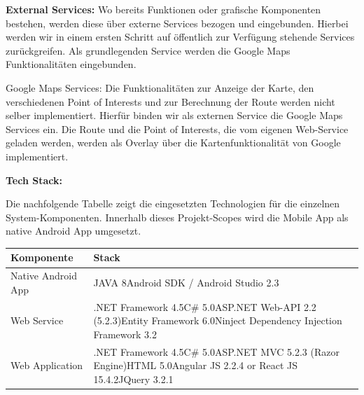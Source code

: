 \documentclass[ngerman,]{article}
\begin{document}
\textbf{External Services:} Wo bereits Funktionen oder grafische
Komponenten bestehen, werden diese über externe Services bezogen und
eingebunden. Hierbei werden wir in einem ersten Schritt auf öffentlich
zur Verfügung stehende Services zurückgreifen. Als grundlegenden Service
werden die Google Maps Funktionalitäten eingebunden.

Google Maps Services: Die Funktionalitäten zur Anzeige der Karte, den
verschiedenen Point of Interests und zur Berechnung der Route werden
nicht selber implementiert. Hierfür binden wir als externen Service die
Google Maps Services ein. Die Route und die Point of Interests, die vom
eigenen Web-Service geladen werden, werden als Overlay über die
Kartenfunktionalität von Google implementiert.

\textbf{Tech Stack:}

Die nachfolgende Tabelle zeigt die eingesetzten Technologien für die
einzelnen System-Komponenten. Innerhalb dieses Projekt-Scopes wird die
Mobile App als native Android App umgesetzt.

\begin{longtable}[]{@{}ll@{}}
\toprule
\begin{minipage}[b]{0.14\columnwidth}\raggedright\strut
\textbf{Komponente}\strut
\end{minipage} & \begin{minipage}[b]{0.80\columnwidth}\raggedright\strut
\textbf{Stack}\strut
\end{minipage}\tabularnewline
\midrule
\endhead
\begin{minipage}[t]{0.14\columnwidth}\raggedright\strut
Native Android App\strut
\end{minipage} & \begin{minipage}[t]{0.80\columnwidth}\raggedright\strut
JAVA 8Android SDK / Android Studio 2.3\strut
\end{minipage}\tabularnewline
\begin{minipage}[t]{0.14\columnwidth}\raggedright\strut
Web Service\strut
\end{minipage} & \begin{minipage}[t]{0.80\columnwidth}\raggedright\strut
.NET Framework 4.5C\# 5.0ASP.NET Web-API 2.2 (5.2.3)Entity Framework
6.0Ninject Dependency Injection Framework 3.2\strut
\end{minipage}\tabularnewline
\begin{minipage}[t]{0.14\columnwidth}\raggedright\strut
Web Application\strut
\end{minipage} & \begin{minipage}[t]{0.80\columnwidth}\raggedright\strut
.NET Framework 4.5C\# 5.0ASP.NET MVC 5.2.3 (Razor Engine)HTML 5.0Angular
JS 2.2.4 or React JS 15.4.2JQuery 3.2.1\strut
\end{minipage}\tabularnewline
\bottomrule
\end{longtable}
\end{document}
